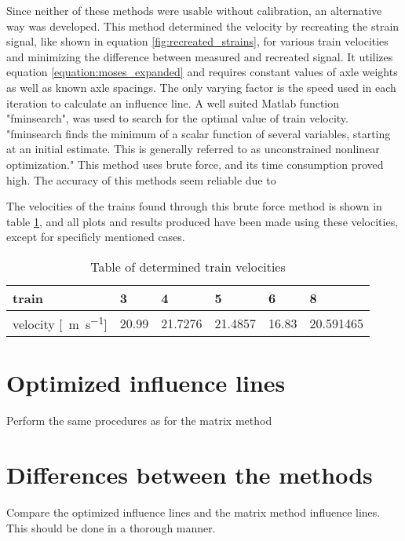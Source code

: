 Since neither of these methods were usable without calibration, an alternative way was developed. This method determined the velocity by recreating the strain signal, like shown in equation  \ref{fig:recreated_strains}, for various train velocities and minimizing the difference between measured and recreated signal. It utilizes equation \ref{equation:moses_expanded} and requires constant values of axle weights as well as known axle spacings. The only varying factor is the speed used in each iteration to calculate an influence line. A well suited Matlab function "fminsearch", was used to search for the optimal value of train velocity. "fminsearch finds the minimum of a scalar function of several variables, starting at an initial estimate. This is generally referred to as unconstrained nonlinear optimization." This method uses brute force, and its time consumption proved high. The accuracy of this methods seem reliable due to

The velocities of the trains found through this brute force method is shown in table \ref{table:speeds}, and all plots and results produced have been made using these velocities, except for specificly mentioned cases.
\begin{table}[h]
	\centering
	\begin{tabularx}{\textwidth}{ |X|X|X|X|X|X| }
		\hline
		train & 3 & 4 & 5 & 6 & 8 \\
		\hline
		velocity [\SI{}{\meter\per\second}] & 20.99 & 21.7276	&21.4857 & 16.83 &	20.591465  \\
		\hline
	\end{tabularx}
	\caption{Table of determined train velocities}
	\label{table:speeds}
\end{table}




\section{Optimized influence lines}
Perform the same procedures as for the matrix method

\section{Differences between the methods}
Compare the optimized influence lines and the matrix method influence lines. This should be done in a thorough manner.
